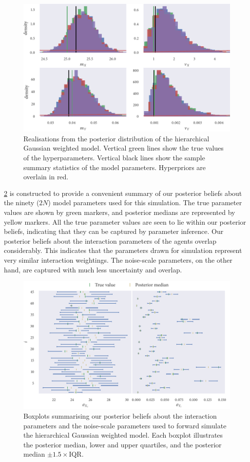 \begin{figure}[tbp]
  \includegraphics{gauss_hier_hist_hypers.pdf}
  \caption{Realisations from the posterior distribution of the hierarchical
    Gaussian weighted model. Vertical green lines show the true values of the
    hyperparameters. Vertical black lines show the sample summary statistics
    of the model parameters. Hyperpriors are overlain in red.}
  \label{fig:gauss_hier_hist}
\end{figure}

\cref{fig:gauss_hier_summary} is constructed to provide a convenient summary of
our posterior beliefs about the ninety ($2N$) model parameters used for this
simulation. The true parameter values are shown by green markers, and posterior
medians are represented by yellow markers. All the true parameter values are
seen to lie within our posterior beliefs, indicating that they can be captured
by parameter inference. Our posterior beliefs about the interaction parameters
of the agents overlap considerably. This indicates that the parameters drawn
for simulation represent very similar interaction weightings. The noise-scale
parameters, on the other hand, are captured with much less uncertainty and
overlap.

\begin{figure}[tbp]
  \includegraphics{gauss_hier_summary.pdf}
  \caption{Boxplots summarising our posterior beliefs about the interaction
    parameters and the noise-scale parameters used to forward simulate the
    hierarchical Gaussian weighted model. Each boxplot illustrates the
    posterior median, lower and upper quartiles, and the posterior median
    $\pm1.5\times\text{IQR}$.}
  \label{fig:gauss_hier_summary}
\end{figure}

